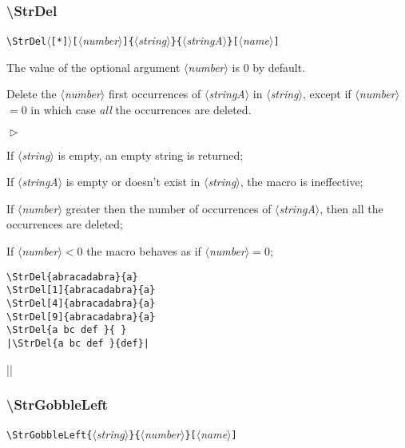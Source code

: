 \documentclass[a4paper,10pt]{article}
\newcommand\argu[1]{$\langle$\textit{#1}$\rangle$}
\newcommand\ARGU[1]{\texttt{\{}\argu{#1}\texttt{\}}}
\newcommand\arguC[1]{\texttt{[}\argu{#1}\texttt{]}}
\newcommand\etoile{$\langle$\texttt{[*]}$\rangle$}
\newenvironment{Conditions}[1][1cm]%
{\begin{list}%
	{$\vartriangleright$}%
	{\setlength{\leftmargin}{#1}
	 \setlength{\itemsep}{0pt}
	 \setlength{\parsep}{0pt}
	 \setlength{\topsep}{2ptplus3ptminus2pt}
	}}%
{\end{list}}
\newcommand\styleexemple{\small\vskip4pt}
\newcommand\verbinline{\lstinline[basicstyle=\normalsize\ttfamily]}
\begin{document}
\subsubsection{\ttfamily\textbackslash StrDel}

\verbinline|\StrDel|\etoile\arguC{number}\ARGU{string}\ARGU{stringA}\arguC{name}
\smallskip

The value of the optional argument \argu{number} is 0 by default.\par\smallskip

Delete the \argu{number} first occurrences of \argu{stringA} in \argu{string}, except if \argu{number}${}=0$ in which case \emph{all} the occurrences are deleted.\medskip

\begin{Conditions}
\item If \argu{string} is empty, an empty string is returned;
\item If \argu{stringA} is empty or doesn't exist in \argu{string}, the macro is ineffective;
\item If \argu{number} greater then the number of occurrences of \argu{stringA}, then all the occurrences are deleted;
\item If \argu{number}${}<0$ the macro behaves as if \argu{number}${}=0$;
\end{Conditions}

\begin{minipage}[t]{0.65\linewidth}
\begin{lstlisting}
\StrDel{abracadabra}{a}
\StrDel[1]{abracadabra}{a}
\StrDel[4]{abracadabra}{a}
\StrDel[9]{abracadabra}{a}
\StrDel{a bc def }{ }
|\StrDel{a bc def }{def}|
\end{lstlisting}%
\end{minipage}\hfill
\begin{minipage}[t]{0.35\linewidth}
	\styleexemple
	\par
	\par
	\par
	\par
	\par
	||
\end{minipage}%

\subsubsection{\ttfamily\textbackslash StrGobbleLeft}
\verbinline|\StrGobbleLeft|\ARGU{string}\ARGU{number}\arguC{name}
\smallskip
\end{document}
